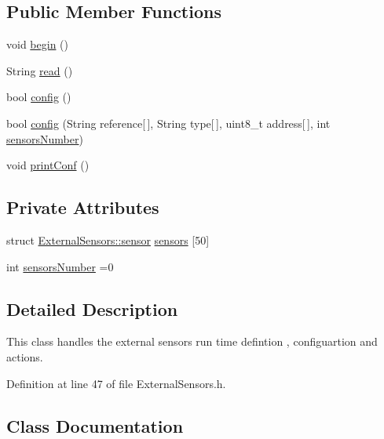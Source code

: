 \subsection*{Public Member Functions}
\begin{DoxyCompactItemize}
\item 
void \hyperlink{class_external_sensors_a58ede0d786a86417254708870f04a21e}{begin} ()
\item 
String \hyperlink{class_external_sensors_a53177b81eca3be89508b5511ddcd00fc}{read} ()
\item 
bool \hyperlink{class_external_sensors_a862a4bd11346b37270d0244c2adabe5a}{config} ()
\item 
bool \hyperlink{class_external_sensors_ac829858f587e15a3fcb00567248f0edd}{config} (String reference\mbox{[}$\,$\mbox{]}, String type\mbox{[}$\,$\mbox{]}, uint8\+\_\+t address\mbox{[}$\,$\mbox{]}, int \hyperlink{class_external_sensors_a58e4fbf9adeae787d92be5fa33043b5d}{sensors\+Number})
\item 
void \hyperlink{class_external_sensors_a78c2bf55084435dd51d3c559b2d3c6f3}{print\+Conf} ()
\end{DoxyCompactItemize}
\subsection*{Private Attributes}
\begin{DoxyCompactItemize}
\item 
struct \hyperlink{class_external_sensors_dd/d58/struct_external_sensors_1_1sensor}{External\+Sensors\+::sensor} \hyperlink{class_external_sensors_a284233f884fcf00154a44740cf1d9e1e}{sensors} \mbox{[}50\mbox{]}
\item 
int \hyperlink{class_external_sensors_a58e4fbf9adeae787d92be5fa33043b5d}{sensors\+Number} =0
\end{DoxyCompactItemize}


\subsection{Detailed Description}
This class handles the external sensors run time defintion , configuartion and actions. 

Definition at line 47 of file External\+Sensors.\+h.



\subsection{Class Documentation}
\label{struct_external_sensors_1_1sensor}
